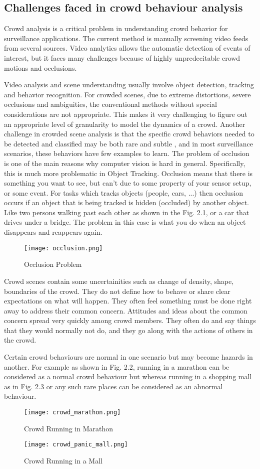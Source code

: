 \subsection{Challenges faced in crowd behaviour analysis}
Crowd analysis is a critical problem in understanding crowd behavior for
surveillance applications. The current method is manually screening video feeds from
several sources. Video analytics allows the automatic detection of events of interest, but
it faces many challenges because of highly unpredecitable crowd motions and occlusions.\par
Video analysis and scene understanding usually involve object detection,
tracking and behavior recognition. For crowded scenes, due to extreme distortions, severe
occlusions and ambiguities, the conventional methods without special considerations are
not appropriate. This makes it very challenging to figure out an appropriate level of granularity
to model the dynamics of a crowd. Another challenge in crowded scene analysis is that
the specific crowd behaviors needed to be detected and classified may be both rare and
subtle , and in most surveillance scenarios, these behaviors have few examples to learn.
The problem of occlusion is one of the main reasons why computer vision is
hard in general. Specifically, this is much more problematic in Object Tracking.
Occlusion means that there is something you want to see, but can't due to some property
of your sensor setup, or some event. For tasks which tracks objects (people, cars, ...)
then occlusion occurs if an object that is being tracked is hidden (occluded) by another
object. Like two persons walking past each other as shown in the Fig. 2.1, or a car that drives under a bridge.
The problem in this case is what you do when an object disappears and reappears again.
\begin{figure}[H]
\centering
\texttt{[image: occlusion.png]}
\caption{Occlusion Problem}
\end{figure}
Crowd scenes contain some uncertainities such as change of density, shape,
boundaries of the crowd. They do not define how to behave or share clear expectations
on what will happen. They often feel something must be done right away to address
their common concern. Attitudes and ideas about the common concern spread very
quickly among crowd members. They often do and say things that they would normally
not do, and they go along with the actions of others in the crowd.\par
Certain crowd behaviours are normal in one scenario but may become hazards in
another. For example as shown in Fig. 2.2, running in a marathon  can be
considered as a normal crowd behaviour but whereas running in a shopping mall as in Fig. 2.3 or any
such rare places can be considered as an abnormal behaviour.
\begin{figure}[H]
\centering
\texttt{[image: crowd\_marathon.png]}
\caption{Crowd Running in Marathon}
\end{figure}
\begin{figure}[H]
\centering
\texttt{[image: crowd\_panic\_mall.png]}
\caption{Crowd Running in a Mall}
\end{figure}
